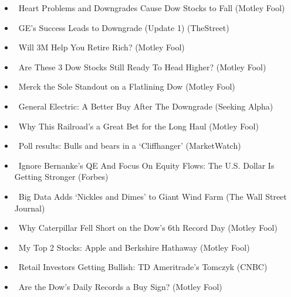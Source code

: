 \documentclass[11pt,asymmetric]{article}
\begin{document}
\begin{itemize}
\item\ Heart Problems and Downgrades Cause Dow Stocks to Fall (Motley Fool)
\item\ GE's Success Leads to Downgrade (Update 1) (TheStreet)
\item\ Will 3M Help You Retire Rich? (Motley Fool)
\item\ Are These 3 Dow Stocks Still Ready To Head Higher? (Motley Fool)
\item\ Merck the Sole Standout on a Flatlining Dow (Motley Fool)
\item\ General Electric: A Better Buy After The Downgrade (Seeking Alpha)
\item\ Why This Railroad's a Great Bet for the Long Haul (Motley Fool)
\item\ Poll results: Bulls and bears in a `Cliffhanger' (MarketWatch)
\item\ Ignore Bernanke's QE And Focus On Equity Flows: The U.S. Dollar Is Getting Stronger (Forbes)
\item\ Big Data Adds `Nickles and Dimes' to Giant Wind Farm (The Wall Street Journal)
\item\ Why Caterpillar Fell Short on the Dow's 6th Record Day (Motley Fool)
\item\ My Top 2 Stocks: Apple and Berkshire Hathaway (Motley Fool)
\item\ Retail Investors Getting Bullish: TD Ameritrade's Tomczyk (CNBC)
\item\ Are the Dow's Daily Records a Buy Sign? (Motley Fool)
\end{itemize}
\end{document}
